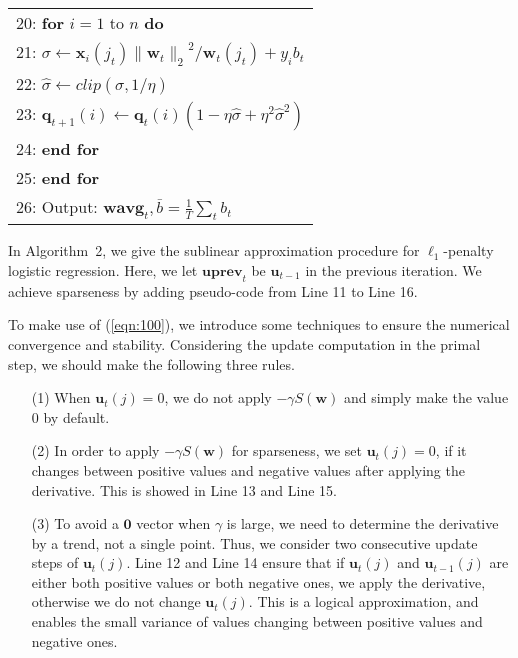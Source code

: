 \documentclass{llncs}
\newcommand{\bw}{\mathbf{w}}
\newcommand{\bwavg}{\mathbf{wavg}}
\newcommand{\bu}{\mathbf{u}}
\newcommand{\buprev}{\mathbf{uprev}}
\newcommand{\bq}{\mathbf{q}}
\newcommand{\lc}{\left(}
\newcommand{\rc}{\right)}
\newcommand{\li}{\lc i\rc}
\newcommand{\tspace}{\hspace*{2em}}
\newcommand{\tspaces}{\hspace*{1.5em}}
\begin{document}
\begin{table}[ht]
\begin{tabular}{l}
		20:   \tspaces \textbf{for} $i=1$ to $n$ \textbf{do} \\
		21:   \tspaces\tspace $\sigma \leftarrow \mathbf{x}_{i} \lc {j}_{t}\rc{\|{\bw}_{t}\|_2}^{2}/{\bw}_{t}\lc {j}_{t} \rc+{y}_{i}{b}_{t}$ \\
		22:   \tspaces\tspace $\hat{\sigma} \leftarrow clip\lc \sigma,1/\eta \rc$ \\
		23:   \tspaces\tspace ${\bq}_{t+1}\li \leftarrow {\bq}_{t}\li\lc 1-\eta\hat{\sigma} + {\eta}^{2}{\hat{\sigma}}^{2} \rc$ \\
		24:   \tspaces \textbf{end for} \\
		25:   \textbf{end for} \\
		26:   Output: $\bwavg_t,\bar{b}=\frac{1}{T}\sum_{t}{b}_{t}$ \\
	\hline
	\end{tabular}
	\end{table}
	
	In Algorithm~2, we give the sublinear approximation procedure for $\ell_1$-penalty logistic regression.
	Here, we let $\buprev_t$  be $\bu_{t-1}$ in the previous iteration.
	We achieve sparseness by adding pseudo-code from Line 11 to Line 16.

	To make use of (\ref{eqn:100}), we introduce some techniques to ensure the numerical convergence and stability.
	Considering the update computation in the primal step, we should make the following three rules.
	
	\begin{enumerate}
	\item[{(1)}] \; When $\bu_t(j)=0$, we do not apply $-\gamma S(\bw)$ and simply make the value 0 by default.
	\item[{(2)}] \; In order to apply  $-\gamma S(\bw)$ for sparseness, we set $\bu_t(j)=0$, if it changes between positive values and negative values after applying the derivative.
	                This is showed in Line 13 and Line 15.
	\item[{(3)}] \; To avoid a $\mathbf{0}$ vector when $\gamma$ is large, we need to determine the derivative by a trend, not a single point. Thus, we consider two consecutive update steps of $\bu_t(j)$. Line 12 and Line 14 ensure that if $\bu_t(j)$ and $\bu_{t-1}(j)$ are either both positive values or both negative ones, we apply the derivative, otherwise we do not change $\bu_t(j)$. This is a logical approximation, and enables the small variance of values changing between positive values and negative ones.
	\end{enumerate}
	
\end{document}
